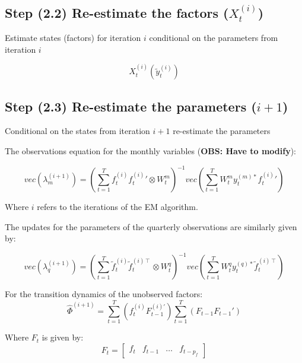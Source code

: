 \documentclass[12pt]{article}
\begin{document}
\begin{appendices}
\subsection{Step (2.2) Re-estimate the factors ($X_{t}^{(i)}$)}
Estimate states (factors) for iteration $i$ conditional on the parameters from iteration $i$

\begin{equation*}
X^{(i)}_{t}(\widetilde{y}_{t}^{(i)})
\end{equation*}

\subsection{Step (2.3) Re-estimate the parameters ($i+1$)}
Conditional on the states from iteration $i+1$ re-estimate the parameters

The observations equation for the monthly variables (\textbf{OBS: Have to modify}):

\begin{equation}
vec{(\lambda_{m}^{(i+1)})} = 
\left(\sum_{t=1}^{T} f_{t}^{(i)} {f_{t}^{(i)}}' \otimes W_{t}^{m} \right)^{-1}
vec\left(\sum_{t=1}^{T} W_{t}^{m} y_{t}^{(m)*} {f_{t}^{(i)}}'\right)
\end{equation}

Where $i$ refers to the iterations of the EM algorithm.

The updates for the parameters of the quarterly observations are similarly given by:

\begin{equation}
vec{(\lambda_{q}^{(i+1)})} = 
\left(\sum_{t=1}^{T} \widetilde{f}_{t}^{(i)} \widetilde{f}_{t}^{(i)\intercal} \otimes W_{t}^{q} \right)^{-1}
vec\left(\sum_{t=1}^{T} W_{t}^{q} y_{t}^{(q)*} \widetilde{f}_{t}^{(i)\intercal}\right)
\end{equation}

For the transition dynamics of the unobserved factors:
\begin{equation}
\widehat{\Phi}^{(i+1)} =  \sum_{t=1}^{T}\left(f_{t}^{(i)} F_{t-1}^{(i)'}\right) \sum_{t=1}^{T}\left(F_{t-1}F_{t-1}'\right)
\end{equation}

Where $F_{t}$ is given by:
\begin{equation}
F_{t} = 
\begin{bmatrix}
f_{t} & f_{t-1} & \dots & f_{t-p_{f}}
\end{bmatrix}
\end{equation}


\end{appendices}
\end{document}
